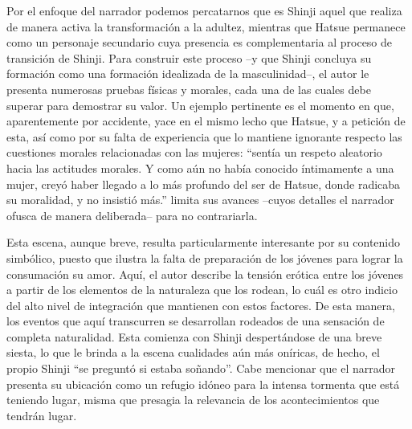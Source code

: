 Por el enfoque del narrador podemos percatarnos que es Shinji aquel que realiza de manera activa la transformación a la adultez, mientras que Hatsue permanece como un personaje secundario cuya presencia es complementaria al proceso de transición de Shinji.
Para construir este proceso --y que Shinji concluya su formación como una formación idealizada de la masculinidad--, el autor le presenta numerosas pruebas físicas y morales, cada una de las cuales debe superar para demostrar su valor. Un ejemplo pertinente es el momento en que, aparentemente por accidente, yace en el mismo lecho que Hatsue, y a petición de esta, así como por su falta de experiencia que lo mantiene ignorante respecto las cuestiones morales relacionadas con las mujeres: ``sentía un respeto aleatorio hacia las actitudes morales. Y como aún no había conocido íntimamente a una mujer, creyó haber llegado a lo más profundo del ser de Hatsue, donde radicaba su moralidad, y no insistió más.'' limita sus avances --cuyos detalles el narrador ofusca de manera deliberada--  para no contrariarla.

Esta escena, aunque breve, resulta particularmente interesante por su contenido simbólico, puesto que ilustra la falta de preparación de los jóvenes para lograr la consumación su amor.
Aquí, el autor describe la tensión erótica entre los jóvenes a partir de los elementos de la naturaleza que los rodean, lo cuál es otro indicio del alto nivel de integración que mantienen con estos factores.
De esta manera, los eventos que aquí transcurren se desarrollan rodeados de una sensación de completa naturalidad.
Esta comienza con Shinji despertándose de una breve siesta, lo que le brinda a la escena cualidades aún más oníricas, de hecho, el propio Shinji ``se preguntó si estaba soñando''.%
Cabe mencionar que el narrador presenta su ubicación como un refugio idóneo para la intensa tormenta que está teniendo lugar, misma que presagia la relevancia de los acontecimientos que tendrán lugar.

